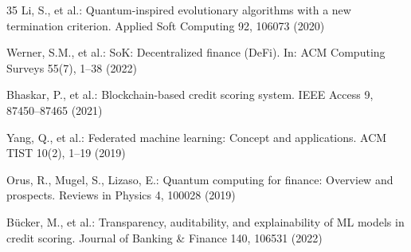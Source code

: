 \documentclass[runningheads]{llncs}
\begin{document}
\begin{thebibliography}{35}
Li, S., et al.: Quantum-inspired evolutionary algorithms with a new termination criterion. Applied Soft Computing 92, 106073 (2020)

Werner, S.M., et al.: SoK: Decentralized finance (DeFi). In: ACM Computing Surveys 55(7), 1--38 (2022)

Bhaskar, P., et al.: Blockchain-based credit scoring system. IEEE Access 9, 87450--87465 (2021)

Yang, Q., et al.: Federated machine learning: Concept and applications. ACM TIST 10(2), 1--19 (2019)

Orus, R., Mugel, S., Lizaso, E.: Quantum computing for finance: Overview and prospects. Reviews in Physics 4, 100028 (2019)

B\"ucker, M., et al.: Transparency, auditability, and explainability of ML models in credit scoring. Journal of Banking \& Finance 140, 106531 (2022)

\end{thebibliography}
\end{document}
